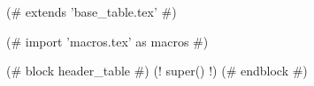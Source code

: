 (# extends 'base_table.tex' #)

(# import 'macros.tex' as macros #)


(# block header_table #)
(! super() !)
(# endblock #)